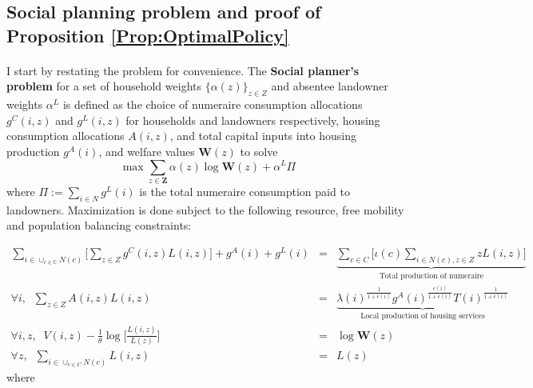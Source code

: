 \documentclass[12pt]{article}
\begin{document}
	
	
	\clearpage
	
	\subsection{Social planning problem and proof of Proposition \ref{Prop:OptimalPolicy}}\label{Appendix:SocialPlanningModel}
	
	\paragraph*{}
	I start by restating the problem for convenience. The \textbf{Social planner's problem} for a set of household weights $\{\alpha(z)\}_{z \in Z}$ and absentee landowner weights $\alpha^{L}$ is defined as the choice of numeraire consumption allocations $g^{C}(i, z)$ and $g^{L}(i, z)$ for households and landowners respectively, housing consumption allocations $A(i, z)$, and total capital inputs into housing production $g^{A}(i)$, and welfare values $\boldsymbol{W}(z)$ to solve
	\begin{equation}
		\max   \sum_{z \in \boldsymbol{Z}}\alpha(z)\log \boldsymbol{W}(z) +\alpha^{L}\Pi
	\end{equation}
	where  $\Pi:= \sum_{i \in N}g^{L}(i)$ is the total numeraire consumption paid to landowners. Maximization is done subject to the following resource, free mobility and population balancing constraints:
	
	
	\begin{align}
		\sum_{i \in \cup_{c \in \mathbb{C}}N(c)}\big[\sum_{z \in Z}g^{C}(i, z)L(i, z)\big] + g^{A}(i) + g^{L}(i)& = & \underbrace{\sum_{c \in C}\bigg[\iota(c)\sum_{i \in N(c), z \in Z}zL(i, z) \bigg]}_{\text{Total production of numeraire}} \label{OptPolicy:BalancedGBudgetAppendix} \\
		\forall i, \; \; \sum_{z \in Z}A(i, z)L(i, z) & = & \underbrace{\lambda(i)^{\frac{1}{1 + \epsilon(i)}}g^{A}(i)^{\frac{\epsilon(i)}{1 + \epsilon(i)}}T(i)^{\frac{1}{1 + \epsilon(i)}}}_{\text{Local production of housing services}} \label{OptPolicy:BalancedHBudgetAppendix} \\
		\forall i, z,	\; \; V(i, z) - \frac{1}{\theta} \log \bigg[\frac{L(i, z)}{L(z)}\bigg]	 & = & \log \boldsymbol{W}(z) \label{OptPolicy:FreeMobilityAppendix} 	\\
		\forall z,	\; \;\sum_{i \in \cup_{c \in C}N(c)}L(i, z) & = & L(z) \label{OptPolicy:PopulationBalanceAppendix}
	\end{align}
	 where 
	 
\end{document}
